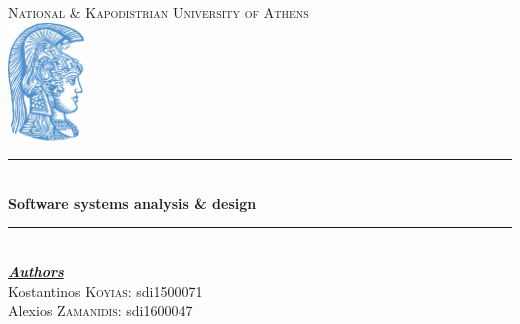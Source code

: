 \documentclass[12pt]{article}
\begin{document}
\begin{titlepage}

\newcommand{\HRule}{\rule{\linewidth}{0.5mm}} %

\center %

\textsc{\huge National \& Kapodistrian University of Athens}\\[1.5cm] %
\includegraphics[width=20mm,scale=0.5]{logo.jpeg}\\


\HRule \\[0.4cm]
{ \large \bfseries Software systems analysis \& design}\\[0.4cm] %
\HRule \\[1.5cm]
 

\large \emph{\textbf{\underline{Authors}}}\\
Kostantinos \textsc{Koyias}: sdi1500071\\
Alexios \textsc{Zamanidis}: sdi1600047

 

\vfill %

\end{titlepage}
\end{document}
